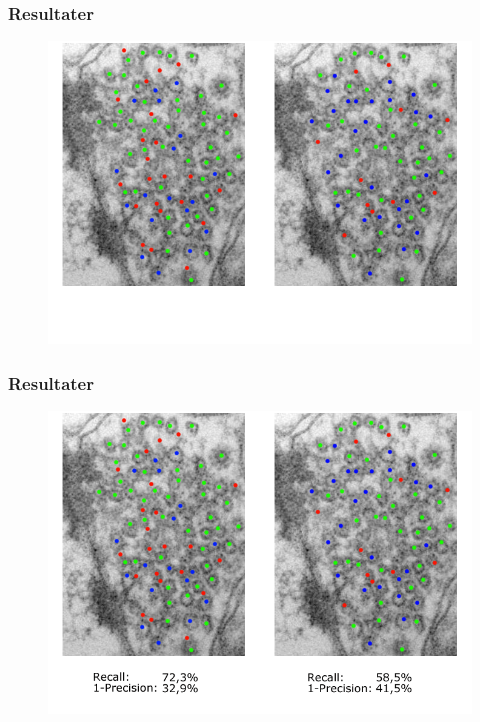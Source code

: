 \documentclass[12pt,t]{beamer}
\begin{document}
\begin{frame}
\frametitle{Resultater}
\begin{figure}[H]
	\centering
	\includegraphics[scale=0.4]{img/afstand/res_1.png}
\end{figure}
\end{frame}

\begin{frame}
\frametitle{Resultater}
\begin{figure}[H]
	\centering
	\includegraphics[scale=0.4]{img/afstand/res_2.png}
\end{figure}
\end{frame}

\end{document}
